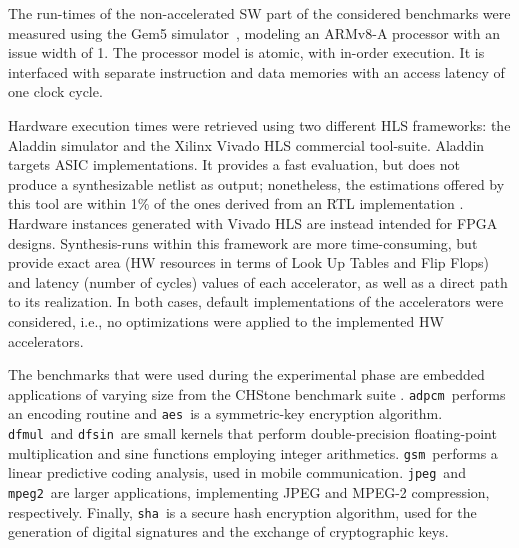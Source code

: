 \documentclass[]{usiinfthesis}
\newcommand{\adpcm}{\texttt{adpcm}}
\newcommand{\sha}{\texttt{sha}}
\newcommand{\jpeg}{\texttt{jpeg}}
\newcommand{\mpeg}{\texttt{mpeg2}}
\newcommand{\aes}{\texttt{aes}}
\newcommand{\dfmul}{\texttt{dfmul}}
\newcommand{\dfsin}{\texttt{dfsin}}
\newcommand{\gsm}{\texttt{gsm}}
\begin{document}
The run-times of the non-accelerated SW part of the considered
benchmarks were measured using the Gem5
simulator~\cite{BinkertFeb11}, modeling an ARMv8-A processor with an
issue width of 1. The processor model is atomic, with in-order
execution. It is interfaced with separate instruction and data
memories with an access latency of one clock cycle.\par

Hardware execution times were retrieved using two different HLS 
frameworks: the Aladdin simulator and the Xilinx Vivado HLS
commercial tool-suite.  Aladdin targets ASIC implementations.  It
provides a fast evaluation, but does not produce a synthesizable netlist
as output; nonetheless, the estimations offered by this tool are
within 1\% of the ones derived from an RTL implementation
\cite{ShaoJul14}.  Hardware instances generated with Vivado HLS are
instead intended for FPGA designs. Synthesis-runs within this
framework are more time-consuming, but provide exact area (HW resources
in terms of Look Up Tables and Flip Flops)
and latency (number of cycles) values of each accelerator, as well as a direct
path to its realization.  In both cases, default implementations of
the accelerators were considered, i.e., no optimizations were applied to the
implemented HW accelerators.\par

The benchmarks that were used during the experimental phase are embedded applications
of varying size from the CHStone benchmark suite \cite{HaraMay08}.
\adpcm\ performs an encoding routine and \aes\ is a symmetric-key encryption algorithm. 
\dfmul\ and \dfsin\ are small kernels that perform double-precision 
floating-point multiplication and sine functions employing integer arithmetics. 
\gsm\ performs a linear predictive coding analysis, used in mobile communication. 
\jpeg\ and \mpeg\ are larger applications, implementing JPEG and MPEG-2 compression, respectively.
Finally, \sha\ is a secure hash encryption algorithm, used for 
the generation of digital signatures and the exchange of cryptographic keys.\par

\end{document}

